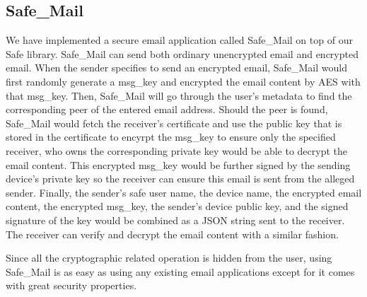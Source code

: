 \subsection{Safe\_Mail}
We have implemented a secure email application called Safe\_Mail on top of our Safe library. Safe\_Mail can send both ordinary unencrypted email and encrypted email. When the sender specifies to send an encrypted email, Safe\_Mail would first randomly generate a msg\_key and encrypted the email content by AES with that msg\_key. Then, Safe\_Mail 
will go through the user's metadata to find the corresponding peer of the entered email address. Should the peer is found, Safe\_Mail would fetch the receiver's certificate and use the public key that is stored in the certificate to encyrpt the msg\_key to ensure only the specified receiver, who owns the corresponding private key would be able to decrypt the email content. This encrypted msg\_key would be further signed by the sending device's private key so the receiver can ensure this email is sent from the alleged sender.
Finally, the sender's safe user name, the device name, the encrypted email content, the encrypted msg\_key, the sender's device public key, and the signed signature of the key would be combined as a JSON string sent to the receiver.
The receiver can verify and decrypt the email content with a similar fashion.

Since all the cryptographic related operation is hidden from the user, using Safe\_Mail is as easy as using any existing email applications except for it comes with great security properties. 

